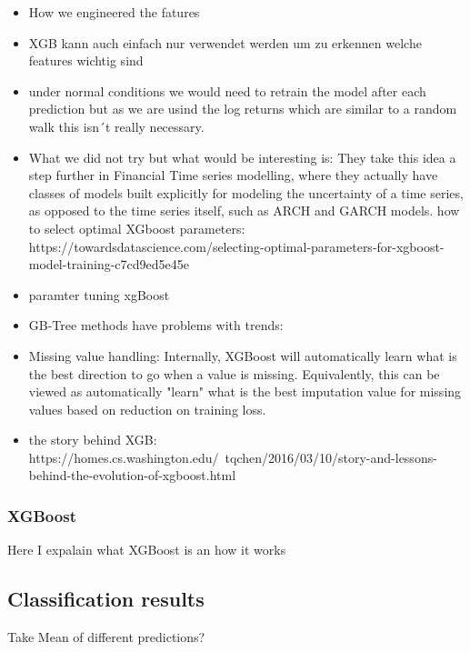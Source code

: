 \begin{itemize}
    \item How we engineered the fatures
    \item XGB kann auch einfach nur verwendet werden um zu erkennen welche features wichtig sind
    \item under normal conditions we would need to retrain the model after each prediction but as we are usind the log returns which are similar to a random walk this isn´t really necessary. 
    \item What we did not try but what would be interesting is: They take this idea a step further in Financial Time series modelling, where they actually have classes of models built explicitly for modeling the uncertainty of a time series, as opposed to the time series itself, such as ARCH and GARCH models.
    \plots how to select optimal XGboost parameters:
    https://towardsdatascience.com/selecting-optimal-parameters-for-xgboost-model-training-c7cd9ed5e45e
    \item paramter tuning xgBoost
    \item GB-Tree methods have problems with trends:
    \item Missing value handling: Internally, XGBoost will automatically learn what is the best direction to go when a value is missing. Equivalently, this can be viewed as automatically "learn" what is the best imputation value for missing values based on reduction on training loss.
    \item the story behind XGB: https://homes.cs.washington.edu/~tqchen/2016/03/10/story-and-lessons-behind-the-evolution-of-xgboost.html
    
\end{itemize}
\subsubsection{XGBoost}
Here I expalain what XGBoost is an how it works

\subsection{Classification results}
Take Mean of different predictions?

